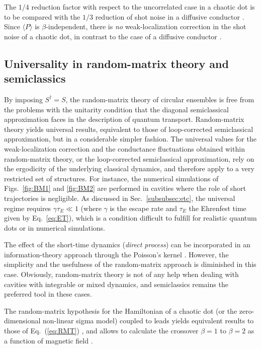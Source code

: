 \documentclass[a4paper,10pt]{article}
\newcommand{\ET}{\tau_{\scriptscriptstyle E}}
\newcommand{\nin}{\noindent}
\begin{document}
\nin The $1/4$ reduction factor with respect to the uncorrelated case in a chaotic dot is to be compared with the $1/3$ reduction of shot noise in a diffusive conductor \cite{CarloMarkus}. Since $\langle P\rangle$ is $\beta$-independent, there is {\em no\/} weak-localization correction in the shot noise of a chaotic dot, in contrast to the case of a diffusive conductor \cite{Jong}. 

\subsection{Universality in random-matrix theory and semiclassics} 

\nin By imposing $S^{\dagger}=S$, the random-matrix theory of circular ensembles is free from the problems with the unitarity condition that the diagonal semiclassical approximation faces in the description of quantum transport. Random-matrix theory yields universal results, equivalent to those of loop-corrected semiclassical approximation, but in a considerable simpler fashion. The universal values for the weak-localization correction and the conductance fluctuations obtained within random-matrix theory, or the loop-corrected semiclassical approximation, rely on the ergodicity of the underlying classical dynamics, and therefore apply to a very restricted set of structures. For instance,  the numerical simulations of Figs.~\ref{fig:BM1} and \ref{fig:BM2} are performed in cavities where the role of short trajectories is negligible. As discussed in Sec.~\ref{subsubsec:etc}, the universal regime requires  
$\gamma \ET \ll 1$ (where $\gamma$ is the escape rate and $\ET$ the Ehrenfest time given by Eq.~\eqref{eq:ET}), which is a condition difficult to fulfill for realistic quantum dots or in numerical simulations.

\nin The effect of the short-time dynamics ({\it direct process}) can be incorporated in an information-theory approach through the Poisson's kernel \cite{DoroSm,MeBa}. However, the simplicity and the usefulness of the random-matrix approach is diminished in this case. Obviously, random-matrix theory is not of any help when dealing with cavities with integrable or mixed dynamics, and semiclassics remains the preferred tool in these cases.


\nin The random-matrix hypothesis for the Hamiltonian of a chaotic dot (or the zero-dimensional non-linear sigma model) coupled to leads yields equivalent results to those of Eq.~(\ref{eq:RMT}) \cite{Iid90,Wei91}, and 
allows to calculate the crossover $\beta=1$ to $\beta=2$ as a function of magnetic field \cite{Weid94}.
\end{document}
